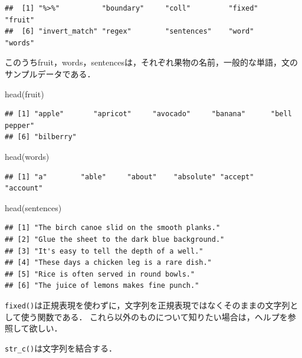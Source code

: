 \documentclass[
]{article}
\newenvironment{Shaded}{\begin{snugshade}}{\end{snugshade}}
\newcommand{\FunctionTok}[1]{\textcolor[rgb]{0.00,0.00,0.00}{#1}}
\newcommand{\NormalTok}[1]{#1}
\begin{document}
\begin{verbatim}
##  [1] "%>%"          "boundary"     "coll"         "fixed"        "fruit"       
##  [6] "invert_match" "regex"        "sentences"    "word"         "words"
\end{verbatim}

このうちfruit，words，sentencesは，それぞれ果物の名前，一般的な単語，文のサンプルデータである．

\begin{Shaded}
\begin{Highlighting}[]
\FunctionTok{head}\NormalTok{(fruit)}
\end{Highlighting}
\end{Shaded}

\begin{verbatim}
## [1] "apple"       "apricot"     "avocado"     "banana"      "bell pepper"
## [6] "bilberry"
\end{verbatim}

\begin{Shaded}
\begin{Highlighting}[]
\FunctionTok{head}\NormalTok{(words)}
\end{Highlighting}
\end{Shaded}

\begin{verbatim}
## [1] "a"        "able"     "about"    "absolute" "accept"   "account"
\end{verbatim}

\begin{Shaded}
\begin{Highlighting}[]
\FunctionTok{head}\NormalTok{(sentences)}
\end{Highlighting}
\end{Shaded}

\begin{verbatim}
## [1] "The birch canoe slid on the smooth planks." 
## [2] "Glue the sheet to the dark blue background."
## [3] "It's easy to tell the depth of a well."     
## [4] "These days a chicken leg is a rare dish."   
## [5] "Rice is often served in round bowls."       
## [6] "The juice of lemons makes fine punch."
\end{verbatim}

\texttt{fixed()}は正規表現を使わずに，文字列を正規表現ではなくそのままの文字列として使う関数である．
これら以外のものについて知りたい場合は，ヘルプを参照して欲しい．

\texttt{str\_c()}は文字列を結合する．
\end{document}
